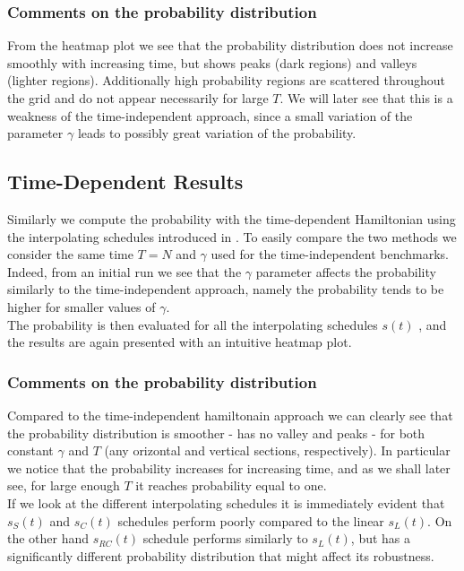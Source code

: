         \subsubsection*{Comments on the probability distribution}
        From the heatmap plot we see that the probability distribution does not increase smoothly with increasing time, but shows peaks (dark regions) and valleys (lighter regions). Additionally high probability regions are scattered throughout the grid and do not appear necessarily for large $T$. We will later see that this is a weakness of the time-independent approach, since a small variation of the parameter $\gamma$ leads to possibly great variation of the probability.

    \subsection{Time-Dependent Results}\label{subsec:time_dependent_results}
        Similarly we compute the probability with the time-dependent Hamiltonian using the interpolating schedules introduced in . To easily compare the two methods we consider the same time $T=N$ and $\gamma$ used for the time-independent benchmarks. Indeed, from an initial run we see that the $\gamma$ parameter affects the probability similarly to the time-independent approach, namely the probability tends to be higher for smaller values of $\gamma$.\\
        The probability is then evaluated for all the interpolating schedules $s(t)$ , and the results are again presented with an intuitive heatmap plot.\\
        

        \subsubsection*{Comments on the probability distribution}
        Compared to the time-independent hamiltonain approach we can clearly see that the probability distribution is smoother - has no valley and peaks - for both constant $\gamma$ and $T$ (any orizontal and vertical sections, respectively). In particular we notice that the probability increases for increasing time, and as we shall later see, for large enough $T$ it reaches probability equal to one.\\ If we look at the different interpolating schedules it is immediately evident that $s_S(t)$ and $s_C(t)$ schedules perform poorly compared to the linear $s_L(t)$. On the other hand $s_{RC}(t)$ schedule performs similarly to $s_L(t)$, but has a significantly different probability distribution  that might affect its robustness.

